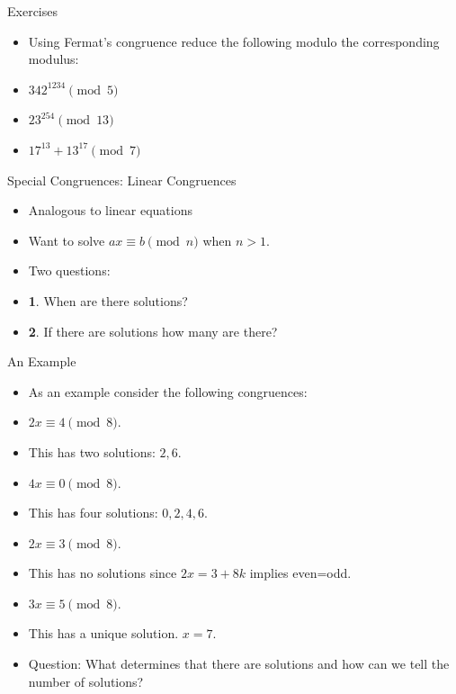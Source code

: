 \documentclass[ %
 usenames,dvipsnames,
aspectratio=169,11pt ]{beamer}
\newenvironment{stepitemize}{\begin{itemize}[<+->]}{\end{itemize} }
\begin{document}
\begin{frame}{Exercises}
\begin{stepitemize}
\item Using Fermat's congruence reduce the following modulo the corresponding modulus:
\item $342^{1234} \pmod{5}$
\item $23^{254} \pmod{13}$
\item $17^{13}+13^{17} \pmod{7}$

\end{stepitemize}

\end{frame}

\begin{frame}{Special Congruences: Linear Congruences}
\begin{stepitemize}
\item Analogous to linear equations
\item Want to solve $ax\equiv b\pmod{n}$ when $n>1$.
\item Two questions:
\item {\bf {\color{red} 1}}. When are there solutions?
\item {\bf {\color{red} 2}}. If there are solutions how many are there?
\end{stepitemize}
\end{frame}

\begin{frame}{An Example}
\begin{stepitemize}
\item As an example consider the following congruences:
\item $2x\equiv 4 \pmod{8}$.
\item This has two solutions: $2, 6$.
\item $4x\equiv 0 \pmod{8}$.
\item This has four solutions: $0,2,4,6$.
\item $2x\equiv 3 \pmod{8}$.
\item This has no solutions since $2x=3+8k$ implies even=odd.
\item $3x\equiv 5 \pmod{8}$.
\item This has a unique solution. $x=7$.
\item Question: What determines that there are solutions and how can we tell the number of solutions?
\end{stepitemize}
\end{frame}
\end{document}
